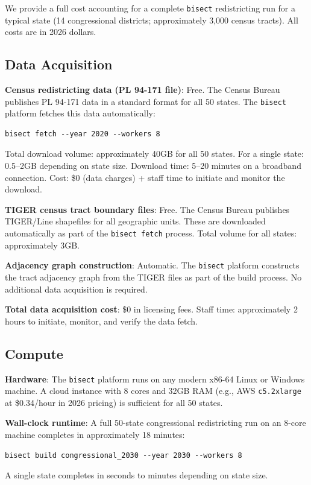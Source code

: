 We provide a full cost accounting for a complete \texttt{bisect} redistricting run for a typical state (14 congressional districts; approximately 3,000 census tracts). All costs are in 2026 dollars.

\subsection{Data Acquisition}

\textbf{Census redistricting data (PL 94-171 file)}: Free. The Census Bureau publishes PL 94-171 data in a standard format for all 50 states. The \texttt{bisect} platform fetches this data automatically:
\begin{verbatim}
bisect fetch --year 2020 --workers 8
\end{verbatim}
Total download volume: approximately 40GB for all 50 states. For a single state: 0.5--2GB depending on state size. Download time: 5--20 minutes on a broadband connection. Cost: \$0 (data charges) + staff time to initiate and monitor the download.

\textbf{TIGER census tract boundary files}: Free. The Census Bureau publishes TIGER/Line shapefiles for all geographic units. These are downloaded automatically as part of the \texttt{bisect fetch} process. Total volume for all states: approximately 3GB.

\textbf{Adjacency graph construction}: Automatic. The \texttt{bisect} platform constructs the tract adjacency graph from the TIGER files as part of the build process. No additional data acquisition is required.

\textbf{Total data acquisition cost}: \$0 in licensing fees. Staff time: approximately 2 hours to initiate, monitor, and verify the data fetch.

\subsection{Compute}

\textbf{Hardware}: The \texttt{bisect} platform runs on any modern x86-64 Linux or Windows machine. A cloud instance with 8 cores and 32GB RAM (e.g., AWS \texttt{c5.2xlarge} at \$0.34/hour in 2026 pricing) is sufficient for all 50 states.

\textbf{Wall-clock runtime}: A full 50-state congressional redistricting run on an 8-core machine completes in approximately 18 minutes:
\begin{verbatim}
bisect build congressional_2030 --year 2030 --workers 8
\end{verbatim}
A single state completes in seconds to minutes depending on state size.

